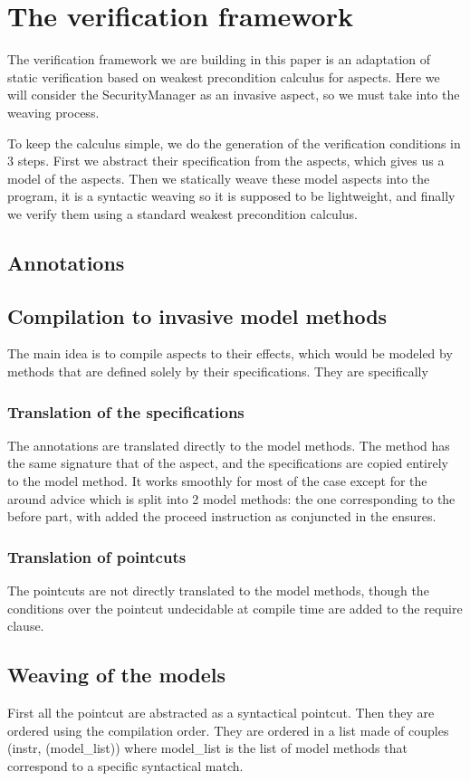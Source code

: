 \documentclass[draft]{llncs}
\begin{document}
\section{The verification framework}
The verification framework we are building in this paper is an adaptation of static
verification based on weakest precondition calculus for aspects. Here we will consider
the SecurityManager as an invasive aspect, so we must take into the weaving process.

To keep the calculus simple, we do the generation of the verification conditions in 3 steps.
First we abstract their specification from the aspects, which gives us a model of the aspects.
Then we statically weave these model aspects into the program, it is a syntactic weaving so
it is supposed to be lightweight, and finally we verify them
using a standard weakest precondition calculus.

\subsection{Annotations}


\subsection{Compilation to invasive model methods}
The main idea is to compile aspects to their effects, which would be modeled by methods that are defined
solely by their specifications. 
They are specifically
\subsubsection{Translation of the specifications}
The annotations are translated directly to the model methods. The method has the same signature
that of the aspect, and the specifications are copied entirely to the model method. It works smoothly
for most of the case except for the around advice which is split into 2 model methods: the one corresponding
to the before part, with added the proceed instruction as conjuncted in the ensures.
\subsubsection{Translation of pointcuts}
The pointcuts are not directly translated to the model methods, though the conditions over the pointcut undecidable
at compile time are added to the require clause.
\subsection{Weaving of the models}
First all the pointcut are abstracted as a syntactical pointcut. Then they are ordered using the compilation
order.
They are ordered in a list made of couples (instr, (model\_list)) where model\_list is the list of model methods 
that correspond to a specific syntactical match.
\end{document}
